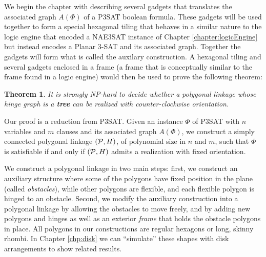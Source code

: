 \documentclass[10pt]{CSUNthesis}
\theoremstyle{plain}%
\newtheorem{thm}{Theorem}
\theoremstyle{definition}
\theoremstyle{remark}
\renewcommand{\PP}{{\cal P}} %
\begin{document}
We begin the chapter with describing several gadgets that translates the associated graph $A(\Phi)$ of a P3SAT boolean formula.  
These gadgets will be used together to form a special hexagonal tiling that behaves in a similar nature to the logic engine that encoded a NAE3SAT instance of Chapter \ref{chapter:logicEngine} but instead encodes a Planar 3-SAT and its associated graph.
Together the gadgets will form what is called the auxilary construction.
A hexagonal tiling and several gadgets enclosed in a frame (a frame that is conceptually similar to the frame found in a logic engine) would then be used to prove the following theorem:
\begin{thm}\label{thm:hinge2}
It is strongly NP-hard to decide whether a polygonal linkage whose hinge graph is a \textbf{tree} can be realized with counter-clockwise orientation.
\end{thm}
Our proof is a reduction from P3SAT.
Given an instance $\Phi$ of P3SAT with $n$ variables and $m$ clauses and its associated graph $A(\Phi)$, we construct a simply connected polygonal linkage $(\PP,H)$, of polynomial size in $n$ and $m$, such that $\Phi$ is satisfiable if and only if $(\PP,H)$ admits a realization with fixed orientation. 

We construct a polygonal linkage in two main steps: first, we construct an auxiliary structure where some of the polygons have fixed position in the plane (called \emph{obstacles}), while other polygons are flexible, and each flexible polygon is hinged to an obstacle. 
Second, we modify the auxiliary construction into a polygonal linkage by allowing the obstacles to move freely, and by adding new polygons and hinges as well as an exterior \emph{frame} that holds the obstacle polygons in place.
All polygons in our constructions are regular hexagons or long, skinny rhombi.
In Chapter \ref{chp:disk} we can ``simulate'' these shapes with disk arrangements to show related results.
\end{document}
